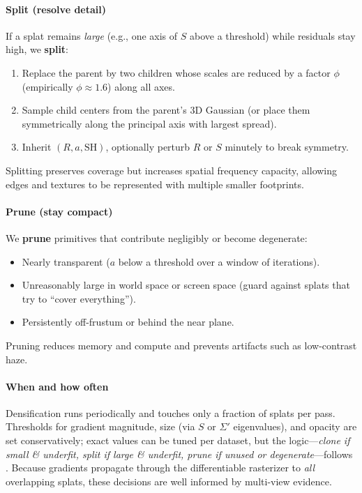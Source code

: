 \begin{enrichment}
\begin{enrichment}
\begin{enrichment}
        \paragraph{Split (resolve detail)}
        If a splat remains \emph{large} (e.g., one axis of $S$ above a threshold) while residuals stay high, we \textbf{split}:
        \begin{enumerate}
            \item Replace the parent by two children whose scales are reduced by a factor $\phi$ (empirically $\phi{\approx}1.6$) along all axes.
            \item Sample child centers from the parent’s 3D Gaussian (or place them symmetrically along the principal axis with largest spread).
            \item Inherit $(R,a,\text{SH})$, optionally perturb $R$ or $S$ minutely to break symmetry.
        \end{enumerate}
        Splitting preserves coverage but increases spatial frequency capacity, allowing edges and textures to be represented with multiple smaller footprints.
        
        \paragraph{Prune (stay compact)}
        We \textbf{prune} primitives that contribute negligibly or become degenerate:
        \begin{itemize}
            \item Nearly transparent ($a$ below a threshold over a window of iterations).
            \item Unreasonably large in world space or screen space (guard against splats that try to ``cover everything'').
            \item Persistently off-frustum or behind the near plane.
        \end{itemize}
        Pruning reduces memory and compute and prevents artifacts such as low-contrast haze.
        
        \paragraph{When and how often}
        Densification runs periodically and touches only a fraction of splats per pass.
        Thresholds for gradient magnitude, size (via $S$ or $\Sigma'$ eigenvalues), and opacity are set conservatively; exact values can be tuned per dataset, but the logic—\emph{clone if small \& underfit, split if large \& underfit, prune if unused or degenerate}—follows \cite{kerbl2023_3dgaussiansplatting}.
        Because gradients propagate through the differentiable rasterizer to \emph{all} overlapping splats, these decisions are well informed by multi-view evidence.
        

\end{enrichment}
\end{enrichment}
\end{enrichment}
